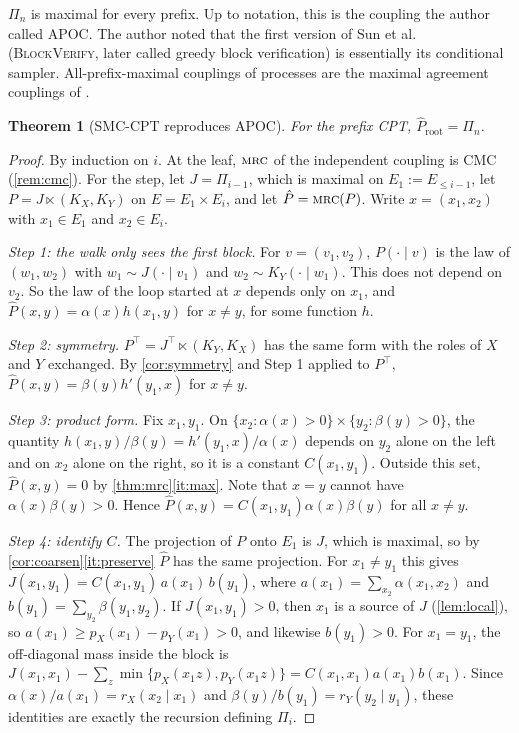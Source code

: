 \documentclass[11pt]{article}
\newtheorem{theorem}{Theorem}[section]
\theoremstyle{definition}
\newcommand{\pX}{p_X}
\newcommand{\pY}{p_Y}
\newcommand{\hP}{\hat P}
\newcommand{\MRC}{\textnormal{\textsc{mrc}}}
\begin{document}
$\Pi_n$ is maximal for every prefix. Up to notation, this is the coupling the
author called APOC. The author noted that the first version of Sun et
al.~\cite{sun2024block} (\textsc{BlockVerify}, later called greedy block
verification) is essentially its conditional sampler. All-prefix-maximal
couplings of processes are the maximal agreement couplings of
\cite{vollering2016maximal,ernst2019mexit}.

\begin{theorem}[SMC-CPT reproduces APOC]\label{thm:apoc}
For the prefix CPT, $\hP_{\mathrm{root}}=\Pi_n$.
\end{theorem}
\begin{proof}
By induction on $i$. At the leaf, $\MRC$ of the independent coupling is CMC
(\cref{rem:cmc}). For the step, let $J=\Pi_{i-1}$, which is maximal on
$E_1:=E_{\le i-1}$, let $P=J\ltimes(K_X,K_Y)$ on $E=E_1\times E_i$, and let
$\hP=\MRC(P)$. Write $x=(x_1,x_2)$ with $x_1\in E_1$ and $x_2\in E_i$.

\emph{Step 1: the walk only sees the first block.} For
$v=(v_1,v_2)$, $P(\cdot\mid v)$ is the law of $(w_1,w_2)$ with
$w_1\sim J(\cdot\mid v_1)$ and $w_2\sim K_Y(\cdot\mid w_1)$. This does not
depend on $v_2$. So the law of the loop started at $x$ depends only on $x_1$,
and $\hP(x,y)=\alpha(x)h(x_1,y)$ for $x\ne y$, for some function $h$.

\emph{Step 2: symmetry.} $P^{\top}=J^{\top}\ltimes(K_Y,K_X)$ has the same form
with the roles of $X$ and $Y$ exchanged. By \cref{cor:symmetry} and Step 1
applied to $P^\top$, $\hP(x,y)=\beta(y)h'(y_1,x)$ for $x\neq y$.

\emph{Step 3: product form.} Fix $x_1,y_1$. On
$\{x_2:\alpha(x)>0\}\times\{y_2:\beta(y)>0\}$, the quantity
$h(x_1,y)/\beta(y)=h'(y_1,x)/\alpha(x)$ depends on $y_2$ alone on the left and
on $x_2$ alone on the right, so it is a constant $C(x_1,y_1)$. Outside this set,
$\hP(x,y)=0$ by \cref{thm:mrc}\ref{it:max}. Note that $x=y$ cannot have
$\alpha(x)\beta(y)>0$. Hence $\hP(x,y)=C(x_1,y_1)\alpha(x)\beta(y)$ for all
$x\neq y$.

\emph{Step 4: identify $C$.} The projection of $P$ onto $E_1$ is $J$, which is
maximal, so by \cref{cor:coarsen}\ref{it:preserve} $\hP$ has the same
projection. For $x_1\neq y_1$ this gives
$J(x_1,y_1)=C(x_1,y_1)\,a(x_1)\,b(y_1)$, where $a(x_1)=\sum_{x_2}\alpha(x_1,x_2)$
and $b(y_1)=\sum_{y_2}\beta(y_1,y_2)$. If $J(x_1,y_1)>0$, then $x_1$ is a source
of $J$ (\cref{lem:local}), so $a(x_1)\ge\pX(x_1)-\pY(x_1)>0$, and likewise
$b(y_1)>0$. For $x_1=y_1$, the off-diagonal mass inside the block is
$J(x_1,x_1)-\sum_{z}\min\{\pX(x_1z),\pY(x_1z)\}=C(x_1,x_1)a(x_1)b(x_1)$. Since
$\alpha(x)/a(x_1)=r_X(x_2\mid x_1)$ and $\beta(y)/b(y_1)=r_Y(y_2\mid y_1)$,
these identities are exactly the recursion defining $\Pi_i$.
\end{proof}
\end{document}

